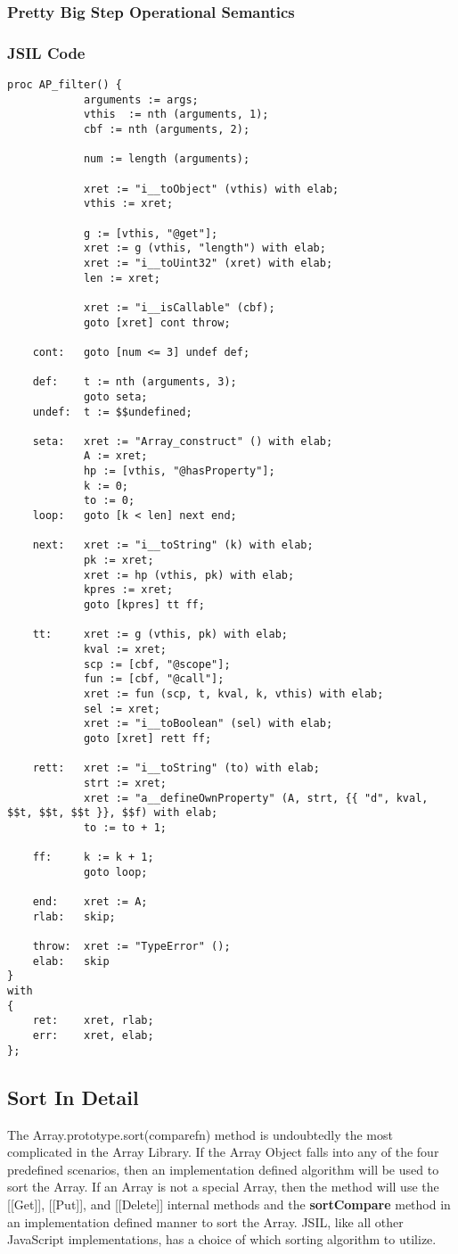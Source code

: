 \documentclass[a4paper,11pt,twoside]{report}
\begin{document}
\subsubsection{Pretty Big Step Operational Semantics}
\subsubsection{JSIL Code}
\begin{adjustwidth}{2cm}{2cm}
\begin{lstlisting}
proc AP_filter() {
			arguments := args;
			vthis  := nth (arguments, 1);
			cbf := nth (arguments, 2);
			
			num := length (arguments);
			
			xret := "i__toObject" (vthis) with elab;
			vthis := xret;
			
			g := [vthis, "@get"];
			xret := g (vthis, "length") with elab;
			xret := "i__toUint32" (xret) with elab;
			len := xret;
			
			xret := "i__isCallable" (cbf);
			goto [xret] cont throw;
			
	cont:	goto [num <= 3] undef def;
	
	def:	t := nth (arguments, 3);
			goto seta;
	undef:	t := $$undefined;
	
	seta:	xret := "Array_construct" () with elab;
			A := xret;
			hp := [vthis, "@hasProperty"];
			k := 0;
			to := 0;
	loop:	goto [k < len] next end;
			
	next:	xret := "i__toString" (k) with elab;
			pk := xret;
			xret := hp (vthis, pk) with elab;
			kpres := xret;
			goto [kpres] tt ff;
			
	tt:		xret := g (vthis, pk) with elab;
			kval := xret;
			scp := [cbf, "@scope"];
			fun := [cbf, "@call"];
			xret := fun (scp, t, kval, k, vthis) with elab;
			sel := xret;
			xret := "i__toBoolean" (sel) with elab;
			goto [xret] rett ff;
			
	rett:	xret := "i__toString" (to) with elab;
			strt := xret;
			xret := "a__defineOwnProperty" (A, strt, {{ "d", kval, $$t, $$t, $$t }}, $$f) with elab;
			to := to + 1;
	
	ff:		k := k + 1;
			goto loop;
		
	end:	xret := A;
	rlab:	skip;
	
	throw:	xret := "TypeError" ();
	elab:	skip
}
with
{
	ret: 	xret, rlab;
	err: 	xret, elab;
};
\end{lstlisting}
\end{adjustwidth}

\subsection{Sort In Detail}\label{sec:sort}
The Array.prototype.sort(comparefn) method is undoubtedly the most complicated in the Array Library. If the Array Object falls into any of the four predefined scenarios, then an implementation defined algorithm will be used to sort the Array. If an Array is not a special Array, then the method will use the [[Get]], [[Put]], and [[Delete]] internal methods and the \textbf{sortCompare} method in an implementation defined manner to sort the Array. JSIL, like all other JavaScript implementations, has a choice of which sorting algorithm to utilize. 
\end{document}
